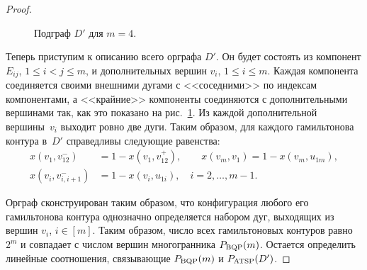 \begin{proof}
\begin{figure}[tbh]
	\caption{Подграф $D'$ для $m=4$.}
	\label{fig:BQP2ATSP-3}
\end{figure}
	
	Теперь приступим к описанию всего орграфа $D'$.
	Он будет состоять из компонент $E_{ij}$, $1\le i < j \le m$, и дополнительных вершин $v_i$, $1\le i\le m$.
	Каждая компонента соединяется своими внешними дугами с <<соседними>> по индексам компонентами, а <<крайние>> компоненты соединяются с дополнительными вершинами так, как это показано на рис.~\ref{fig:BQP2ATSP-3}.
	Из каждой дополнительной вершины~$v_i$ выходит ровно две дуги.
	Таким образом, для каждого гамильтонова контура в~$D'$ справедливы следующие равенства:
	\begin{equation}
	\label{lin5}
	\begin{aligned}
	x(v_1, v^-_{12}) &= 1 - x(v_1, v^+_{12}), \qquad	x(v_m, v_1) = 1 - x(v_m, u_{1m}), \\
	x(v_i, v^-_{i, i+1}) &= 1 - x(v_i, u_{1i}), \quad i = 2,\dots,m-1.
	\end{aligned}
	\end{equation}
	
	Орграф сконструирован таким образом, что конфигурация любого его гамильтонова контура однозначно определяется набором дуг, выходящих из вершин $v_i$, $i\in[m]$.
	Таким образом, число всех гамильтоновых контуров равно $2^{m}$ и совпадает
	с числом вершин многогранника $P_{\textup{BQP}}(m)$.
	Остается определить линейные соотношения, связывающие $P_{\textup{BQP}}(m)$ и $P_{\textup{ATSP}}(D')$.
	

\end{proof}
